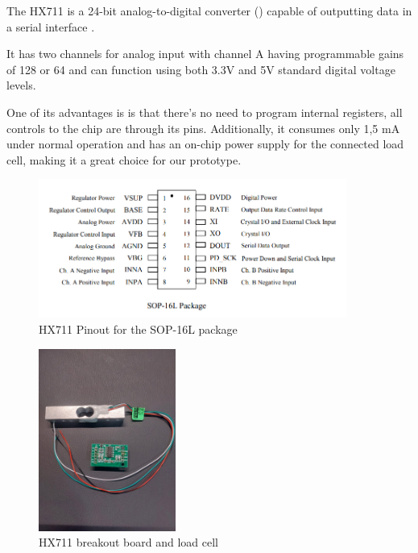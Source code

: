 \documentclass[openright]{normas-utf-tex} %
\begin{document}
The HX711 is a 24-bit analog-to-digital converter ()
capable of outputting data in a serial interface \cite{Avia2022}.

It has two channels for analog input with channel A having programmable gains of 128 or 64 and
can function using both 3.3V and 5V standard digital voltage levels.

One of its advantages is is that there's no need to program internal registers,
all controls to the chip are through its pins. Additionally, it consumes only
1,5 mA under normal operation and has an on-chip power supply for the connected
load cell, making it a great choice for our prototype.

\begin{figure}[H]
	\centering
	\includegraphics[width=0.9\textwidth]{./images/hx711-pinout.png}
	\caption[HX711 Pinout for the SOP-16L package]{HX711 Pinout for the SOP-16L package}
	\label{fig:architecture}
\end{figure}

\begin{figure}[H]
	\centering
	\includegraphics[width=0.4\textwidth]{./images/hx711.jpeg}
	\caption[HX711 breakout board and load cell]{HX711 breakout board and load cell}
	\label{fig:weighttesting}
\end{figure}
\end{document}

